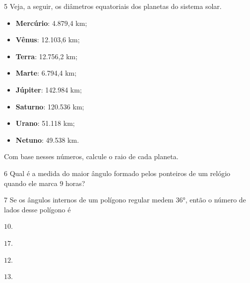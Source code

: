 
\num{5}  Veja, a seguir, os diâmetros equatoriais dos planetas do sistema
solar.

\begin{myquote}
\begin{itemize}
  \item \textbf{Mercúrio}: 4.879,4 km;
  \item \textbf{Vênus}: 12.103,6 km;
  \item \textbf{Terra}: 12.756,2 km;
  \item \textbf{Marte}: 6.794,4 km;
  \item \textbf{Júpiter}: 142.984 km;
  \item \textbf{Saturno}: 120.536 km;
  \item \textbf{Urano}: 51.118 km;
  \item \textbf{Netuno}: 49.538 km.
\end{itemize}
\end{myquote}

Com base nesses números, calcule o raio de cada planeta.


\num{6}  Qual é a medida do maior ângulo formado pelos ponteiros de um relógio
quando ele marca $9$ horas?


\num{7}  Se os ângulos internos de um polígono regular medem $36$°, então o
número de lados desse polígono é

\begin{multicols}{2}
\begin{escolha}
\item $10$. 
\item $17$.
\item $12$.
\item $13$.
\end{escolha}
\end{multicols}

